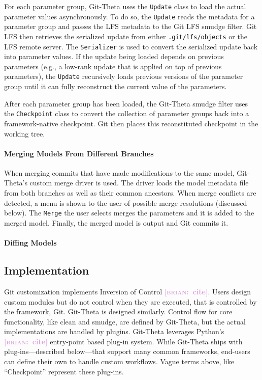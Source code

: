 \documentclass[nohyperref]{article}
\def\code#1{\texttt{#1}}
\theoremstyle{plain}
\theoremstyle{definition}
\theoremstyle{remark}
\newcommand{\brian}[1]{\textcolor{Plum}{\bf\small [\textsc{brian}:~#1]}}
\begin{document}
For each parameter group, Git-Theta uses the \code{Update} class to load the actual parameter values asynchronously. To do so, the \code{Update} reads the metadata for a parameter group and passes the LFS metadata to the Git LFS smudge filter. Git LFS then retrieves the serialized update from either \code{.git/lfs/objects} or the LFS remote server.  The \code{Serializer} is used to convert the serialized update back into parameter values. If the update being loaded depends on previous parameters (e.g., a low-rank update that is applied on top of previous parameters), the \code{Update} recursively loads previous versions of the parameter group until it can fully reconstruct the current value of the parameters.

After each parameter group has been loaded, the Git-Theta smudge filter uses the \code{Checkpoint} class to convert the collection of parameter groups back into a framework-native checkpoint. Git then places this reconstituted checkpoint in the working tree.

\paragraph{Merging Models From Different Branches}
When merging commits that have made modifications to the same model, Git-Theta's custom merge driver is used. The driver loads the model metadata file from both branches as well as their common ancestors. When merge conflicts are detected, a menu is shown to the user of possible merge resolutions (discussed below). The \code{Merge} the user selects merges the parameters and it is added to the merged model. Finally, the merged model is output and Git commits it.

\paragraph{Diffing Models}

\subsection{Implementation} \label{sec:implementation}

Git customization implements Inversion of Control \brian{cite}. Users design custom modules but do not control when they are executed, that is controlled by the framework, Git. Git-Theta is designed similarly. Control flow for core functionality, like clean and smudge, are defined by Git-Theta, but the actual implementations are handled by plugins. Git-Theta leverages Python's \brian{cite} entry-point based plug-in system. While Git-Theta ships with plug-ins---described below---that support many common frameworks, end-users can define their own to handle custom workflows. Vague terms above, like ``Checkpoint'' represent these plug-ins.
\end{document}
